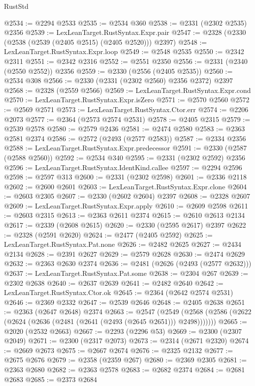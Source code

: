 \begin{lexlean}{RustStd}
\begin{coremodule}
@2534 := @2294 @2533
@2535 := @2534 @360
@2538 := @2331 (@2302 @2535) @2356
@2539 := LexLeanTarget.RustSyntax.Expr.pair
@2547 := @2328 (@2330 (@2538 (@2539 (@2405 @2515) (@2405 @2520))) @2397)
@2548 := LexLeanTarget.RustSyntax.Expr.loop
@2549 := @2548 @2535
@2550 := @2342 @2311
@2551 := @2342 @2316
@2552 := @2551 @2350
@2556 := @2331 (@2340 (@2550 @2552)) @2356
@2559 := @2330 (@2556 (@2405 @2535))
@2560 := @2534 @308
@2566 := @2330 (@2331 (@2302 @2560) @2356 @2372) @2397
@2568 := @2328 (@2559 @2566)
@2569 := LexLeanTarget.RustSyntax.Expr.cond
@2570 := LexLeanTarget.RustSyntax.Expr.isZero
@2571 := @2570 @2560
@2572 := @2569 @2571
@2573 := LexLeanTarget.RustSyntax.Ctor.err
@2574 := @2206 @2073
@2577 := @2364 (@2573 @2574 @2531)
@2578 := @2405 @2315
@2579 := @2539 @2578
@2580 := @2579 @2436
@2581 := @2474 @2580
@2583 := @2363 @2581 @2374
@2586 := @2572 (@2493 (@2577 @2583))
@2587 := @2334 @2356
@2588 := LexLeanTarget.RustSyntax.Expr.predecessor
@2591 := @2330 (@2587 (@2588 @2560))
@2592 := @2534 @340
@2595 := @2331 (@2302 @2592) @2356
@2596 := LexLeanTarget.RustSyntax.IdentKind.callee
@2597 := @2294 @2596
@2598 := @2597 @313
@2600 := @2331 (@2302 @2598)
@2601 := @2336 @2118
@2602 := @2600 @2601
@2603 := LexLeanTarget.RustSyntax.Expr.clone
@2604 := @2603 @2305
@2607 := @2330 (@2602 @2604) @2397
@2608 := @2328 @2607
@2609 := LexLeanTarget.RustSyntax.Expr.apply
@2610 := @2609 @2598
@2611 := @2603 @2315
@2613 := @2363 @2611 @2374
@2615 := @2610 @2613 @2134
@2617 := @2339 (@2608 @2615)
@2620 := @2330 (@2595 @2617) @2397
@2622 := @2328 (@2591 @2620)
@2624 := @2477 (@2405 @2592)
@2625 := LexLeanTarget.RustSyntax.Pat.none
@2626 := @2482 @2625
@2627 := @2434 @2134
@2628 := @2391 @2627
@2629 := @2579 @2628
@2630 := @2474 @2629
@2632 := @2363 @2630 @2374
@2636 := @2481 (@2626 (@2493 (@2577 @2632)))
@2637 := LexLeanTarget.RustSyntax.Pat.some
@2638 := @2304 @267
@2639 := @2302 @2638
@2640 := @2637 @2639
@2641 := @2482 @2640
@2642 := LexLeanTarget.RustSyntax.Ctor.ok
@2645 := @2364 (@2642 @2574 @2531)
@2646 := @2369 @2332
@2647 := @2539 @2646
@2648 := @2405 @2638
@2651 := @2363 (@2647 @2648) @2374
@2663 := @2547
    (@2549 (@2568 (@2586 (@2622 (@2624 (@2636 (@2481 (@2641 (@2493 (@2645 @2651))) @2498)))))))
@2665 := @2020 (@2532 @2663)
@2667 := @2293 (@2296 @53)
@2669 := @2300 (@2307 @2049)
@2671 := @2300 (@2317 @2073)
@2673 := @2314 (@2671 @2320)
@2674 := @2669 @2673
@2675 := @2667 @2674
@2676 := @2325 @2132
@2677 := @2675 @2676
@2679 := @2358 (@2359 @267)
@2680 := @2369 @2305
@2681 := @2363 @2680
@2682 := @2363 @2578
@2683 := @2682 @2374
@2684 := @2681 @2683
@2685 := @2373 @2684

\end{coremodule}
\end{lexlean}
